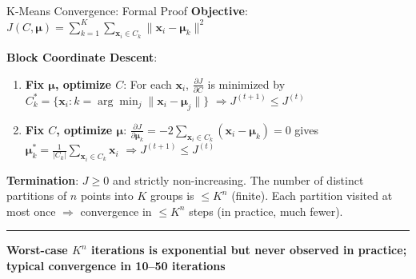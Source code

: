 \documentclass[8pt,aspectratio=169]{beamer}
\newcommand{\bottomnote}[1]{%
\vfill
\vspace{-2mm}
\textcolor{mllavender2}{\rule{\textwidth}{0.4pt}}
\vspace{1mm}
\footnotesize
\textbf{#1}
}
\begin{document}
\begin{frame}[t]{K-Means Convergence: Formal Proof}
\textbf{Objective}: $J(C, \boldsymbol{\mu}) = \sum_{k=1}^{K}\sum_{\mathbf{x}_i \in C_k} \|\mathbf{x}_i - \boldsymbol{\mu}_k\|^2$

\textbf{Block Coordinate Descent}:
\begin{enumerate}
\item \textbf{Fix $\boldsymbol{\mu}$, optimize $C$}: For each $\mathbf{x}_i$, $\frac{\partial J}{\partial C}$ is minimized by $C_k^* = \{\mathbf{x}_i : k = \arg\min_j \|\mathbf{x}_i - \boldsymbol{\mu}_j\|\}$ \quad $\Rightarrow J^{(t+1)} \leq J^{(t)}$
\item \textbf{Fix $C$, optimize $\boldsymbol{\mu}$}: $\frac{\partial J}{\partial \boldsymbol{\mu}_k} = -2\sum_{\mathbf{x}_i \in C_k}(\mathbf{x}_i - \boldsymbol{\mu}_k) = 0$ gives $\boldsymbol{\mu}_k^* = \frac{1}{|C_k|}\sum_{\mathbf{x}_i \in C_k}\mathbf{x}_i$ \quad $\Rightarrow J^{(t+1)} \leq J^{(t)}$
\end{enumerate}
\vspace{0.3em}
\textbf{Termination}: $J \geq 0$ and strictly non-increasing. The number of distinct partitions of $n$ points into $K$ groups is $\leq K^n$ (finite). Each partition visited at most once $\Rightarrow$ convergence in $\leq K^n$ steps (in practice, much fewer).
\bottomnote{Worst-case $K^n$ iterations is exponential but never observed in practice; typical convergence in 10--50 iterations}
\end{frame}
\end{document}
